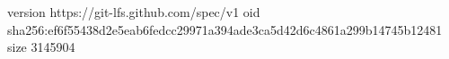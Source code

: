 version https://git-lfs.github.com/spec/v1
oid sha256:ef6f55438d2e5eab6fedcc29971a394ade3ca5d42d6c4861a299b14745b12481
size 3145904
